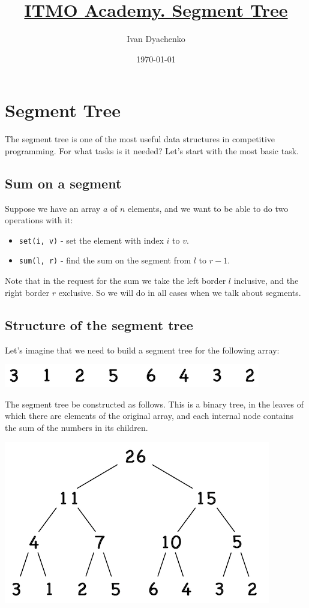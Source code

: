 \documentclass[11pt]{article}
\author{Ivan Dyachenko}
\date{\today}
\title{\href{https://codeforces.com/edu/course/2/lesson/4}{ITMO Academy. Segment Tree}}
\begin{document}
\maketitle
\tableofcontents


\section{Segment Tree}
\label{sec:org2fed6a8}
The segment tree is one of the most useful data structures in competitive programming. For what
tasks is it needed? Let's start with the most basic task.

\subsection{Sum on a segment}
\label{sec:org1544e93}
Suppose we have an array \(a\) of \(n\) elements, and we want to be able to do two operations with
it:
\begin{itemize}
\item \texttt{set(i, v)} - set the element with index \(i\) to \(v\).
\item \texttt{sum(l, r)} - find the sum on the segment from \(l\) to \(r - 1\).
\end{itemize}

Note that in the request for the sum we take the left border \(l\) inclusive, and the right border
\(r\) exclusive. So we will do in all cases when we talk about segments.

\subsection{Structure of the segment tree}
\label{sec:org1cc8885}
Let's imagine that we need to build a segment tree for the following array:
\begin{center}
\includegraphics[width=.9\linewidth]{./images/segment-tree-1.png}
\end{center}

The segment tree be constructed as follows. This is a binary tree, in the leaves of which there
are elements of the original array, and each internal node contains the sum of the numbers in its
children.
\begin{center}
\includegraphics[width=.9\linewidth]{./images/segment-tree-2.png}
\end{center}
\end{document}
